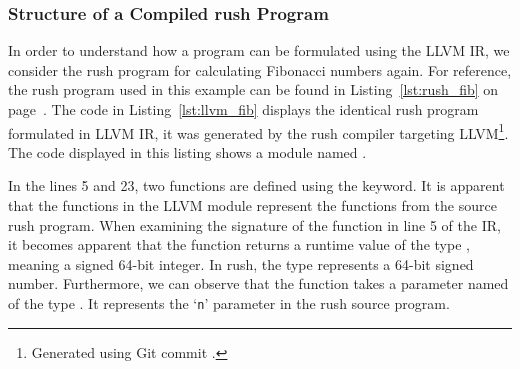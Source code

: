 \subsubsection{Structure of a Compiled rush Program}
In order to understand how a program can be formulated using the LLVM IR, we consider the rush program for calculating Fibonacci numbers again.
For reference, the rush program used in this example can be found in Listing~\ref{lst:rush_fib} on page~\pageref{lst:rush_fib}.
The code in Listing~\ref{lst:llvm_fib} displays the identical rush program formulated in LLVM IR,
it was generated by the rush compiler targeting LLVM\footnote{Generated using Git commit \rushCommit{}.}.
The code displayed in this listing shows a module named .


In the lines 5 and 23, two functions are defined using the  keyword.
It is apparent that the functions in the LLVM module represent the functions from the source rush program.
When examining the signature of the  function in line 5 of the IR,
it becomes apparent that the function returns a runtime value of the type , meaning a signed 64-bit integer.
In rush, the  type represents a 64-bit signed number.
Furthermore, we can observe that the function takes a parameter named  of the type .
It represents the `\texttt{n}' parameter in the rush source program.

